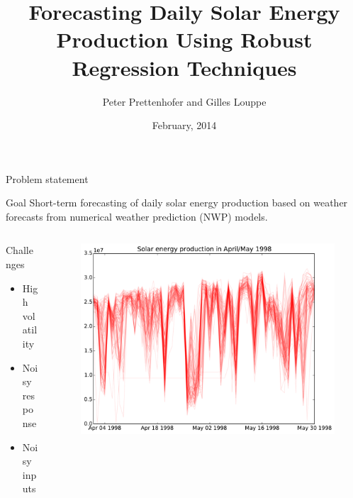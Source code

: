 \documentclass[handout]{beamer}
\title{Forecasting Daily Solar Energy Production Using Robust Regression Techniques}
\author{Peter Prettenhofer and Gilles Louppe}
\institute{Graz University of Technology, Austria\\
Université de Liège, Belgium}
\date{February, 2014}
\begin{document}

\begin{frame}
\titlepage
\end{frame}



\begin{frame}{Problem statement}
  \begin{block}{Goal}
      Short-term forecasting of daily solar energy production based on weather forecasts from numerical weather prediction (NWP) models.
  \end{block}


\begin{columns}[T]
\begin{column}{.45\textwidth}

  \begin{block}{Challenges}
      \begin{itemize}
         \item High volatility  %
         \item Noisy response  %
         \item Noisy inputs %
      \end{itemize}
  \end{block}

\end{column}
\begin{column}{.45\textwidth}
  \begin{figure}
    \includegraphics[width=\textwidth]{images/volatility.pdf}
  \end{figure}

\end{column}
\end{columns}
\end{frame}
\end{document}

